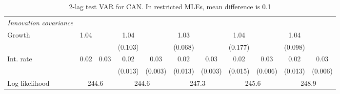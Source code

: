 \begin{table}[htbp]
\begin{tabular}{@{\extracolsep{4pt}}lcccccccccc@{}}
\rule{0pt}{4ex} \emph{Innovation covariance}  	 & 	 & 	 & 	 & 	 & 	 & 	 & 	 & 	 & 	 &\\ 
\quad Growth 	 &1.04 	 &  	 & 1.04 	 &  	 & 1.03 	 &  	 & 1.04 	 &  	 & 1.04 	 & 	 \\ 
 		 &  	 &  	 & (0.103) 	 &  	 & (0.068) 	 &  	 & (0.177) 	 &  	 & (0.098) 	 &  	 \\ 
\quad Int. rate 	 &0.02 	 & 0.03 	 & 0.02 	 & 0.03 	 & 0.02 	 & 0.03 	 & 0.02 	 & 0.03 	 & 0.02 	 & 0.03	 \\ 
 		 &  	 &  	 & (0.013) 	 & (0.003) 	 & (0.013) 	 & (0.003) 	 & (0.015) 	 & (0.006) 	 & (0.013) 	 & (0.006) 	 \\ 
 \hline \rule{0pt}{4ex} 
  Log likelihood 	 &\multicolumn{2}{c}{244.6} 	 & \multicolumn{2}{c}{244.6} 	 & \multicolumn{2}{c}{247.3} 	 & \multicolumn{2}{c}{245.6} 	 & \multicolumn{2}{c}{248.9}\\ 

 \hline 	\end{tabular}		\caption{2-lag test VAR for CAN. In restricted MLEs, mean difference is 0.1}
		\label{tab:CAN2lag}

\end{table}